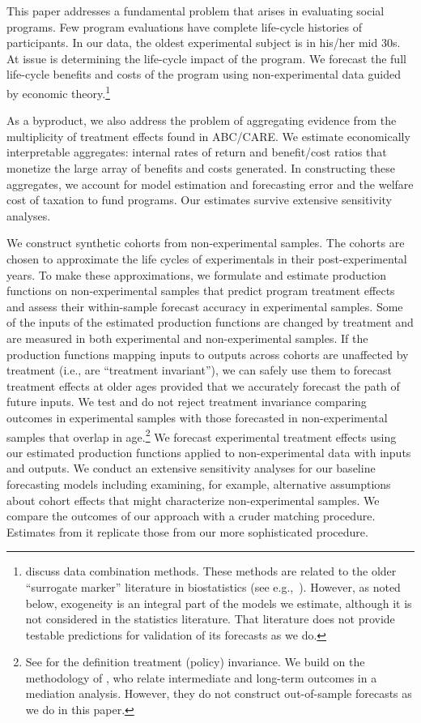This paper addresses a fundamental problem that arises in evaluating social programs. Few program evaluations have complete life-cycle histories of participants. In our data, the oldest experimental subject is in his/her mid 30s. At issue is determining the life-cycle impact of the program. We forecast the full life-cycle benefits and costs of the program using non-experimental data guided by economic theory.\footnote{\citet{Ridder_Moffitt_2007_hbk_metricsdata} discuss data combination methods. These methods are related to the older ``surrogate marker'' literature in biostatistics (see e.g.,\ \citealp{Prentice_1989_Surrogate_SiM}). However, as noted below, exogeneity is an integral part of the models we estimate, although it is not considered in the statistics literature. That literature does not provide testable predictions for validation of its forecasts as we do.}

As a byproduct, we also address the problem of aggregating evidence from the multiplicity of treatment effects found in ABC/CARE. We estimate economically interpretable aggregates: internal rates of return and benefit/cost ratios that monetize the large array of benefits and costs generated. In constructing these aggregates, we account for model estimation and forecasting error and the welfare cost of taxation to fund programs. Our estimates survive extensive sensitivity analyses.

We construct synthetic cohorts from non-experimental samples. The cohorts are chosen to approximate the life cycles of experimentals in their post-experimental years. To make these approximations, we formulate and estimate production functions on non-experimental samples that predict program treatment effects and assess their within-sample forecast accuracy in experimental samples. Some of the inputs of the estimated production functions are changed by treatment and are measured in both experimental and non-experimental samples. If the production functions mapping inputs to outputs across cohorts are unaffected by treatment (i.e., are ``treatment invariant''), we can safely use them to forecast treatment effects at older ages provided that we accurately forecast the path of future inputs. We test and do not reject treatment invariance comparing outcomes in experimental samples with those forecasted in non-experimental samples that overlap in age.\footnote{See \cite{Hurwicz_1962_structural} for the definition treatment (policy) invariance. We build on the methodology of \citet{Heckman_Pinto_etal_2013_PerryFactor}, who relate intermediate and long-term outcomes in a mediation analysis. However, they do not construct out-of-sample forecasts as we do in this paper.} We forecast experimental treatment effects using our estimated production functions applied to non-experimental data with inputs and outputs. We conduct an extensive sensitivity analyses for our baseline forecasting models including examining, for example, alternative assumptions about cohort effects that might characterize non-experimental samples. We compare the outcomes of our approach with a cruder matching procedure. Estimates from it replicate those from our more sophisticated procedure.

